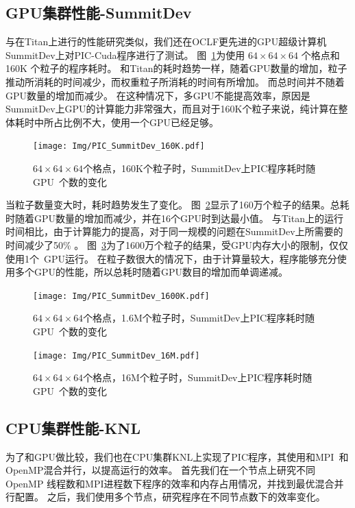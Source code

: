 \subsection{GPU集群性能-SummitDev}
与在Titan上进行的性能研究类似，我们还在OCLF更先进的GPU超级计算机SummitDev上对PIC-Cuda程序进行了测试。
图~\ref{fig:PIC_SummitDev_160K}为使用 $64\times64\times64$ 个格点和  160K 个粒子的程序耗时。
和Titan的耗时趋势一样，随着GPU数量的增加，粒子推动所消耗的时间减少，而权重粒子所消耗的时间有所增加。
而总时间并不随着GPU数量的增加而减少。
在这种情况下，多GPU不能提高效率，原因是SummitDev上GPU的计算能力非常强大，而且对于160K个粒子来说，纯计算在整体耗时中所占比例不大，使用一个GPU已经足够。

\begin{figure}[!htb]
  \centering
  \texttt{[image: Img/PIC\_SummitDev\_160K.pdf]}
  \caption{$64 \times 64 \times 64$个格点，160K个粒子时，SummitDev上PIC程序耗时随GPU~个数的变化}
  \label{fig:PIC_SummitDev_160K}
\end{figure}

当粒子数量变大时，耗时趋势发生了变化。
图~\ref{fig:PIC_SummitDev_1600K}显示了160万个粒子的结果。总耗时随着GPU数量的增加而减少，并在16个GPU时到达最小值。
与Titan上的运行时间相比，由于计算能力的提高，对于同一规模的问题在SummitDev上所需要的时间减少了50\% 。
图~\ref{fig:PIC_SummitDev_16M}为了1600万个粒子的结果，受GPU内存大小的限制，仅仅使用1个~GPU运行。
在粒子数很大的情况下，由于计算量较大，程序能够充分使用多个GPU的性能，所以总耗时随着GPU数目的增加而单调递减。

\begin{figure}[!htb]
  \centering
  \texttt{[image: Img/PIC\_SummitDev\_1600K.pdf]}
  \caption{$64 \times 64 \times 64$个格点，1.6M个粒子时，SummitDev上PIC程序耗时随GPU~个数的变化}
  \label{fig:PIC_SummitDev_1600K}
\end{figure}

\begin{figure}[!htb]
  \centering
  \texttt{[image: Img/PIC\_SummitDev\_16M.pdf]}
  \caption{$64 \times 64 \times 64$个格点，16M个粒子时，SummitDev上PIC程序耗时随GPU~个数的变化}
  \label{fig:PIC_SummitDev_16M}
\end{figure}

\subsection{CPU集群性能-KNL}        \label{section:PIC_Performance_CPUcluster}
为了和GPU做比较，我们也在CPU集群KNL上实现了PIC程序，其使用和MPI~和OpenMP混合并行，以提高运行的效率。
首先我们在一个节点上研究不同 OpenMP 线程数和MPI进程数下程序的效率和内存占用情况，并找到最优混合并行配置。
之后，我们使用多个节点，研究程序在不同节点数下的效率变化。


